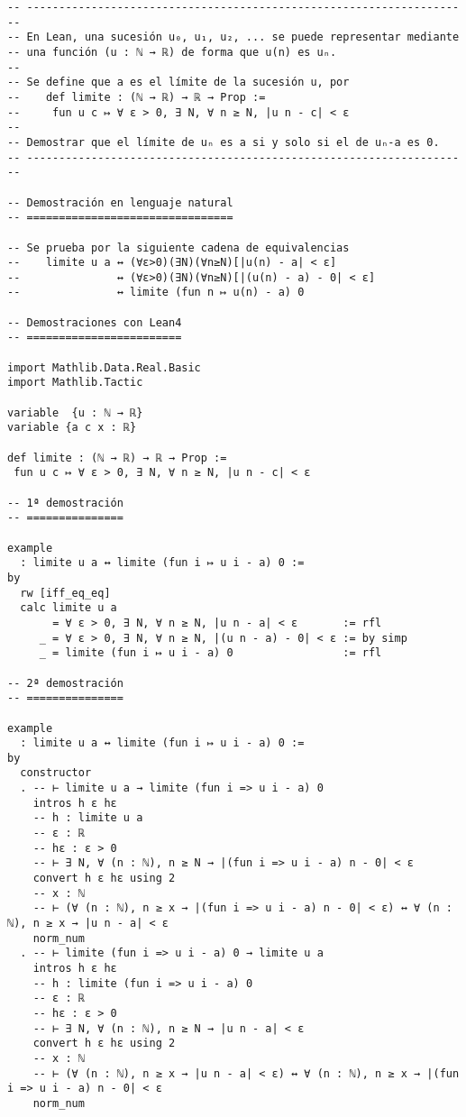 \begin{verbatim}
-- ---------------------------------------------------------------------
-- En Lean, una sucesión u₀, u₁, u₂, ... se puede representar mediante
-- una función (u : ℕ → ℝ) de forma que u(n) es uₙ.
--
-- Se define que a es el límite de la sucesión u, por
--    def limite : (ℕ → ℝ) → ℝ → Prop :=
--     fun u c ↦ ∀ ε > 0, ∃ N, ∀ n ≥ N, |u n - c| < ε
--
-- Demostrar que el límite de uₙ es a si y solo si el de uₙ-a es 0.
-- ---------------------------------------------------------------------

-- Demostración en lenguaje natural
-- ================================

-- Se prueba por la siguiente cadena de equivalencias
--    limite u a ↔ (∀ε>0)(∃N)(∀n≥N)[|u(n) - a| < ε]
--               ↔ (∀ε>0)(∃N)(∀n≥N)[|(u(n) - a) - 0| < ε]
--               ↔ limite (fun n ↦ u(n) - a) 0

-- Demostraciones con Lean4
-- ========================

import Mathlib.Data.Real.Basic
import Mathlib.Tactic

variable  {u : ℕ → ℝ}
variable {a c x : ℝ}

def limite : (ℕ → ℝ) → ℝ → Prop :=
 fun u c ↦ ∀ ε > 0, ∃ N, ∀ n ≥ N, |u n - c| < ε

-- 1ª demostración
-- ===============

example
  : limite u a ↔ limite (fun i ↦ u i - a) 0 :=
by
  rw [iff_eq_eq]
  calc limite u a
       = ∀ ε > 0, ∃ N, ∀ n ≥ N, |u n - a| < ε       := rfl
     _ = ∀ ε > 0, ∃ N, ∀ n ≥ N, |(u n - a) - 0| < ε := by simp
     _ = limite (fun i ↦ u i - a) 0                 := rfl

-- 2ª demostración
-- ===============

example
  : limite u a ↔ limite (fun i ↦ u i - a) 0 :=
by
  constructor
  . -- ⊢ limite u a → limite (fun i => u i - a) 0
    intros h ε hε
    -- h : limite u a
    -- ε : ℝ
    -- hε : ε > 0
    -- ⊢ ∃ N, ∀ (n : ℕ), n ≥ N → |(fun i => u i - a) n - 0| < ε
    convert h ε hε using 2
    -- x : ℕ
    -- ⊢ (∀ (n : ℕ), n ≥ x → |(fun i => u i - a) n - 0| < ε) ↔ ∀ (n : ℕ), n ≥ x → |u n - a| < ε
    norm_num
  . -- ⊢ limite (fun i => u i - a) 0 → limite u a
    intros h ε hε
    -- h : limite (fun i => u i - a) 0
    -- ε : ℝ
    -- hε : ε > 0
    -- ⊢ ∃ N, ∀ (n : ℕ), n ≥ N → |u n - a| < ε
    convert h ε hε using 2
    -- x : ℕ
    -- ⊢ (∀ (n : ℕ), n ≥ x → |u n - a| < ε) ↔ ∀ (n : ℕ), n ≥ x → |(fun i => u i - a) n - 0| < ε
    norm_num


\end{verbatim}

